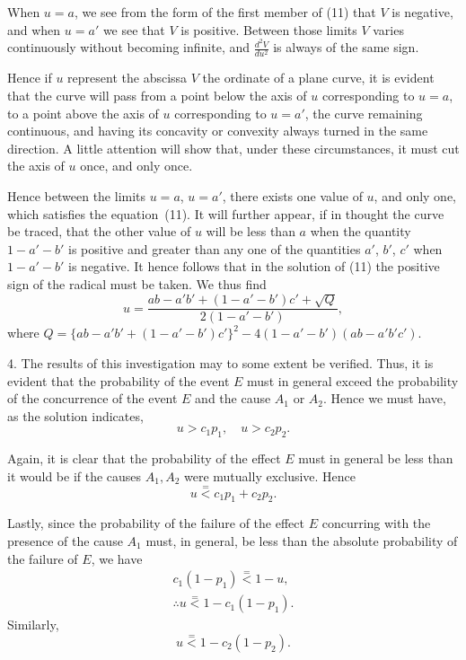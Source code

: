 \documentclass[oneside]{book}
\begin{document}
When $u = a$, we see from the form of the first member of (11)
that $V$ is negative, and when $u = a'$ we see that $V$ is positive.
Between those limits $V$ varies continuously without becoming
infinite, and $\frac{d^2 V}{du^2}$ is always of the same sign.

Hence if $u$ represent the abscissa $V$ the ordinate of a plane
curve, it is evident that the curve will pass from a point below
the axis of $u$ corresponding to $u = a$, to a point above the axis of
$u$ corresponding to $u = a'$, the curve remaining continuous, and
having its concavity or convexity always turned in the same
direction. A little attention will show that, under these circumstances,
it must cut the axis of $u$ once, and only once.

Hence between the limits $u = a$, $u = a'$, there exists one value
of $u$, and only one, which satisfies the equation~(11). It will
further appear, if in thought the curve be traced, that the other
value of $u$ will be less than $a$ when the quantity $1-a'-b'$ is
positive and greater than any one of the quantities $a'$, $b'$, $c'$ when
$1-a'-b'$ is negative. It hence follows that in the solution of
(11) the positive sign of the radical must be taken. We thus
find
\begin{equation*}\tag{13}
u=\frac{ab-a'b'+(1-a'-b')c'+\surd{Q}}{2(1-a'-b')},
\end{equation*}
where  $Q = \{ab - a'b' + (1-a'-b')c'\}^2 - 4(1-a'-b') (ab-a'b'c')$.

4. The results of this investigation may to some extent be
verified. Thus, it is evident that the probability of the event $E$
must in general exceed the probability of the concurrence of the
event $E$ and the cause $A_1$ or $A_2$. Hence we must have, as the
solution indicates,
\begin{equation*}
u > c_1 p_1, \quad u > c_2 p_2.
\end{equation*}

Again, it is clear that the probability of the effect $E$ must in
general be less than it would be if the causes $A_1, A_2$ were
mutually exclusive. Hence
\begin{equation*}
u \stackrel{=}{<} c_1 p_1 + c_2 p_2.
\end{equation*}

Lastly, since the probability of the failure of the effect $E$
concurring with the presence of the cause $A_1$ must, in general, be
less than the absolute probability of the failure of $E$, we have
\begin{gather*}
c_1 (1-p_1) \stackrel{=}{<} 1-u, \\
\therefore u \stackrel{=}{<} 1 - c_1(1-p_1).
\end{gather*}
Similarly,
\begin{equation*}
u \stackrel{=}{<} 1-c_2(1-p_2).
\end{equation*}
\end{document}
